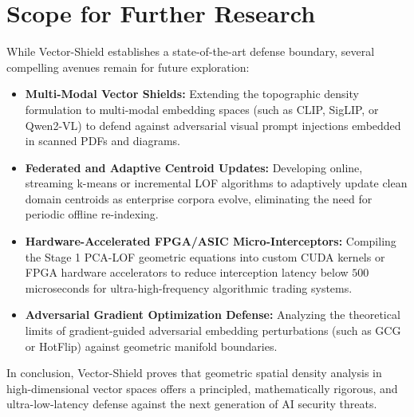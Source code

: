 \section{Scope for Further Research}
While Vector-Shield establishes a state-of-the-art defense boundary, several compelling avenues remain for future exploration:
\begin{itemize}
    \item \textbf{Multi-Modal Vector Shields:} Extending the topographic density formulation to multi-modal embedding spaces (such as CLIP, SigLIP, or Qwen2-VL) to defend against adversarial visual prompt injections embedded in scanned PDFs and diagrams.
    \item \textbf{Federated and Adaptive Centroid Updates:} Developing online, streaming k-means or incremental LOF algorithms to adaptively update clean domain centroids as enterprise corpora evolve, eliminating the need for periodic offline re-indexing.
    \item \textbf{Hardware-Accelerated FPGA/ASIC Micro-Interceptors:} Compiling the Stage 1 PCA-LOF geometric equations into custom CUDA kernels or FPGA hardware accelerators to reduce interception latency below $500$\,microseconds for ultra-high-frequency algorithmic trading systems.
    \item \textbf{Adversarial Gradient Optimization Defense:} Analyzing the theoretical limits of gradient-guided adversarial embedding perturbations (such as GCG or HotFlip) against geometric manifold boundaries.
\end{itemize}

In conclusion, Vector-Shield proves that geometric spatial density analysis in high-dimensional vector spaces offers a principled, mathematically rigorous, and ultra-low-latency defense against the next generation of AI security threats.
